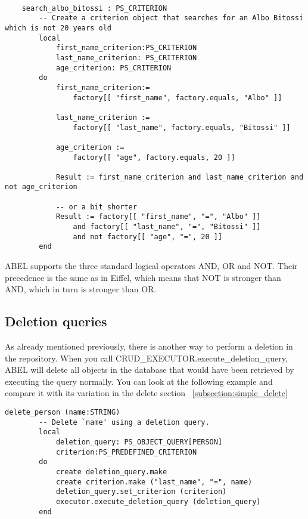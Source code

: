 \begin{lstlisting}[language=OOSC2Eiffel, captionpos=b, caption={}, label={lst:search_albo_bitossi}]

	search_albo_bitossi : PS_CRITERION
		-- Create a criterion object that searches for an Albo Bitossi which is not 20 years old
		local
			first_name_criterion:PS_CRITERION
			last_name_criterion: PS_CRITERION
			age_criterion: PS_CRITERION
		do
			first_name_criterion:= 
				factory[[ "first_name", factory.equals, "Albo" ]]

			last_name_criterion := 
				factory[[ "last_name", factory.equals, "Bitossi" ]]

			age_criterion := 
				factory[[ "age", factory.equals, 20 ]]
			
			Result := first_name_criterion and last_name_criterion and not age_criterion

			-- or a bit shorter
			Result := factory[[ "first_name", "=", "Albo" ]] 
				and factory[[ "last_name", "=", "Bitossi" ]] 
				and not factory[[ "age", "=", 20 ]]
		end
\end{lstlisting}

ABEL supports the three standard logical operators AND, OR and NOT. 
Their precedence is the same as in Eiffel, which means that NOT is stronger than AND, which in turn is stronger than OR.


\subsection{Deletion queries}
\label{subsection:deletion_query}


As already mentioned previously, there is another way to perform a deletion in the repository.
When you call CRUD\_EXECUTOR.execute\_deletion\_query, ABEL will delete all objects in the database that would have been retrieved by executing the query normally.
You can look at the following example and compare it with its variation in the delete section ~\ref{subsection:simple_delete}

\begin{lstlisting}[language=OOSC2Eiffel, captionpos=b, caption={}, label={lst:deletion_query}]
	delete_person (name:STRING)
		-- Delete `name' using a deletion query.
		local
			deletion_query: PS_OBJECT_QUERY[PERSON]
			criterion:PS_PREDEFINED_CRITERION
		do
			create deletion_query.make
			create criterion.make ("last_name", "=", name)
			deletion_query.set_criterion (criterion)
			executor.execute_deletion_query (deletion_query)
		end
\end{lstlisting}

